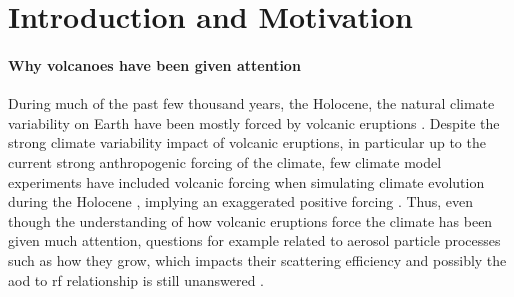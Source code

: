 \documentclass{ametsocV5}
\begin{document}

\section{Introduction and Motivation}

\paragraph*{Why volcanoes have been given attention}

During much of the past few thousand years, the Holocene, the natural climate
variability on Earth have been mostly forced by volcanic eruptions \citep{sigl2022}.
Despite the strong climate variability impact of volcanic eruptions, in particular up to
the current strong anthropogenic forcing of the climate,
few climate model experiments have included volcanic forcing when simulating climate
evolution during the Holocene \citep{sigl2022}, implying an exaggerated positive forcing
\citep{gregory2016}. Thus, even though the understanding of how volcanic eruptions force
the climate has been given much attention, questions for example related to aerosol
particle processes such as how they grow, which impacts their scattering efficiency and
possibly the \ac{aod} to \ac{rf} relationship is still unanswered
\citep[e.g.][]{robock2000,zanchettin2019,marshall2020,marshall2022}.
\end{document}
